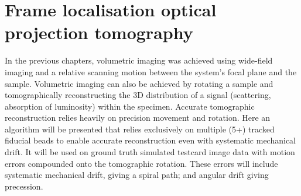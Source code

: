 \ifpdf
    \graphicspath{{Chapters/flopt/Figs/Raster/}{Chapters/flopt/Figs/PDF/}{Chapters/flopt/Figs/}}
\else
    \graphicspath{{Chapters/flopt/Figs/Vector/}{Chapters/flopt/Figs/}}
\fi


\makeatletter
\renewcommand*\env@matrix[1][*\c@MaxMatrixCols c]{%
   \hskip -\arraycolsep
   \let\@ifnextchar\new@ifnextchar
   \array{#1}}
\makeatother

\chapter{Frame localisation optical projection tomography}\label{chapter:flopt}


In the previous chapters, volumetric imaging was achieved using \gls{wide-field} imaging and a relative scanning motion between the system's focal plane and the sample.
Volumetric imaging can also be achieved by rotating a sample and %
tomographically reconstructing the \gls{3D} distribution of a signal (scattering, absorption of luminosity) within the specimen.
Accurate %
tomographic reconstruction relies
heavily on precision movement and rotation.
Here an algorithm will be presented that relies exclusively on multiple (5+) tracked fiducial beads to enable accurate reconstruction even with systematic mechanical drift.
It will be used on ground truth simulated testcard image data with motion errors compounded onto the tomographic rotation.
These errors will include systematic mechanical drift, giving a spiral path; and angular drift giving precession.

